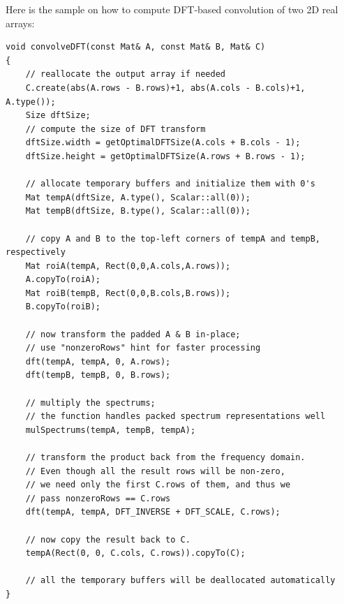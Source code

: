 Here is the sample on how to compute DFT-based convolution of two 2D real arrays:
\begin{lstlisting}
void convolveDFT(const Mat& A, const Mat& B, Mat& C)
{
    // reallocate the output array if needed
    C.create(abs(A.rows - B.rows)+1, abs(A.cols - B.cols)+1, A.type());
    Size dftSize;
    // compute the size of DFT transform
    dftSize.width = getOptimalDFTSize(A.cols + B.cols - 1);
    dftSize.height = getOptimalDFTSize(A.rows + B.rows - 1);
    
    // allocate temporary buffers and initialize them with 0's
    Mat tempA(dftSize, A.type(), Scalar::all(0));
    Mat tempB(dftSize, B.type(), Scalar::all(0));
    
    // copy A and B to the top-left corners of tempA and tempB, respectively
    Mat roiA(tempA, Rect(0,0,A.cols,A.rows));
    A.copyTo(roiA);
    Mat roiB(tempB, Rect(0,0,B.cols,B.rows));
    B.copyTo(roiB);
    
    // now transform the padded A & B in-place;
    // use "nonzeroRows" hint for faster processing
    dft(tempA, tempA, 0, A.rows);
    dft(tempB, tempB, 0, B.rows);
    
    // multiply the spectrums;
    // the function handles packed spectrum representations well
    mulSpectrums(tempA, tempB, tempA);
    
    // transform the product back from the frequency domain.
    // Even though all the result rows will be non-zero,
    // we need only the first C.rows of them, and thus we
    // pass nonzeroRows == C.rows
    dft(tempA, tempA, DFT_INVERSE + DFT_SCALE, C.rows);
    
    // now copy the result back to C.
    tempA(Rect(0, 0, C.cols, C.rows)).copyTo(C);
    
    // all the temporary buffers will be deallocated automatically
}
\end{lstlisting}

